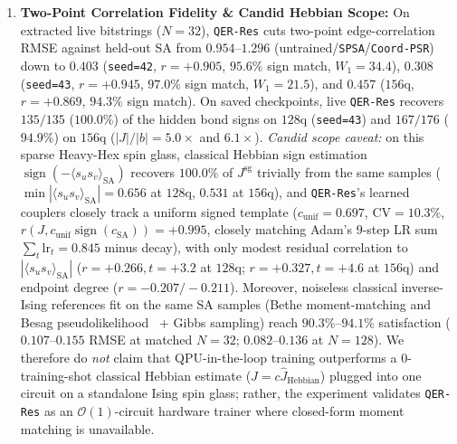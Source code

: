 \documentclass[11pt]{article}
\begin{document}
\begin{enumerate}[leftmargin=1.4em,itemsep=2pt,topsep=2pt]
  \item \textbf{Two-Point Correlation Fidelity \& Candid Hebbian Scope:} On extracted live bitstrings ($N{=}32$), \texttt{QER-Res} cuts two-point edge-correlation RMSE against held-out SA from $0.954$--$1.296$ (untrained/\texttt{SPSA}/\texttt{Coord-PSR}) down to $0.403$ (\texttt{seed=42}, $r{=}+0.905$, $95.6\%$ sign match, $W_1{=}34.4$), $0.308$ (\texttt{seed=43}, $r{=}+0.945$, $97.0\%$ sign match, $W_1{=}21.5$), and $0.457$ ($156$q, $r{=}+0.869$, $94.3\%$ sign match). On saved checkpoints, live \texttt{QER-Res} recovers $135/135$ ($100.0\%$) of the hidden bond signs on $128$q (\texttt{seed=43}) and $167/176$ ($94.9\%$) on $156$q ($|J|/|b|{=}5.0\times$ and $6.1\times$). \emph{Candid scope caveat:} on this sparse Heavy-Hex spin glass, classical Hebbian sign estimation $\operatorname{sign}(-\langle s_u s_v\rangle_{\text{SA}})$ recovers $100.0\%$ of $J^{\text{sg}}$ trivially from the same samples ($\min|\langle s_u s_v\rangle_{\text{SA}}|{=}0.656$ at $128$q, $0.531$ at $156$q), and \texttt{QER-Res}'s learned couplers closely track a uniform signed template ($c_{\text{unif}}{=}0.697$, $\text{CV}{=}10.3\%$, $r(J, c_{\text{unif}}\operatorname{sign}(c_{\text{SA}})){=}+0.995$, closely matching Adam's $9$-step LR sum $\sum_t\text{lr}_t{=}0.845$ minus decay), with only modest residual correlation to $|\langle s_u s_v\rangle_{\text{SA}}|$ ($r{=}+0.266, t{=}+3.2$ at $128$q; $r{=}+0.327, t{=}+4.6$ at $156$q) and endpoint degree ($r{=}-0.207 / -0.211$). Moreover, noiseless classical inverse-Ising references fit on the same SA samples (Bethe moment-matching and Besag pseudolikelihood~\cite{besag1975pl} + Gibbs sampling) reach $90.3\%$--$94.1\%$ satisfaction ($0.107$--$0.155$ RMSE at matched $N{=}32$; $0.082$--$0.136$ at $N{=}128$). We therefore do \emph{not} claim that QPU-in-the-loop training outperforms a $0$-training-shot classical Hebbian estimate ($J{=}c\hat{J}_{\text{Hebbian}}$) plugged into one circuit on a standalone Ising spin glass; rather, the experiment validates \texttt{QER-Res} as an $\mathcal{O}(1)$-circuit hardware trainer where closed-form moment matching is unavailable.

\end{enumerate}
\end{document}
